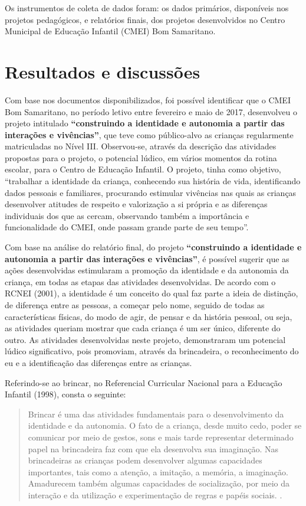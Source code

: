 \begin{refsection}
    Os instrumentos de coleta de dados foram: os dados primários, disponíveis nos projetos pedagógicos, e relatórios finais, dos projetos desenvolvidos no Centro Municipal de Educação Infantil (CMEI) Bom Samaritano.   


    \section{Resultados e discussões}

    Com base nos documentos disponibilizados, foi possível identificar que o CMEI Bom Samaritano, no período letivo entre fevereiro e maio de 2017, desenvolveu o projeto intitulado \textbf{“construindo a identidade e autonomia a partir das interações e vivências”}, que teve como público-alvo as crianças regularmente matriculadas no Nível III. Observou-se, através da descrição das atividades propostas para o projeto, o potencial lúdico, em vários momentos da rotina escolar, para o Centro de Educação Infantil. O projeto, tinha como objetivo, “trabalhar a identidade da criança, conhecendo sua história de vida, identificando dados pessoais e familiares, procurando estimular vivências nas quais as crianças desenvolver atitudes de respeito e valorização a si própria e as diferenças individuais dos que as cercam, observando também a importância e funcionalidade do CMEI, onde passam grande parte de seu tempo”.  

    Com base na análise do relatório final, do projeto \textbf{“construindo a identidade e autonomia a partir das interações e vivências”}, é possível sugerir que as ações desenvolvidas estimularam a promoção da identidade e da autonomia da criança, em todas as etapas das atividades desenvolvidas. De acordo com o RCNEI (2001), a identidade é um conceito do qual faz parte a ideia de distinção, de diferença entre as pessoas, a começar pelo nome, seguido de todas as características físicas, do modo de agir, de pensar e da história pessoal, ou seja, as atividades queriam mostrar que cada criança é um ser único, diferente do outro. As atividades desenvolvidas neste projeto, demonstraram um potencial lúdico significativo, pois promoviam, através da brincadeira, o reconhecimento do eu e a identificação das diferenças entre as crianças. 

    Referindo-se ao brincar, no Referencial Curricular Nacional para a Educação Infantil (1998), consta o seguinte: 

    \begin{quotation}
        Brincar é uma das atividades fundamentais para o desenvolvimento da identidade e da autonomia. O fato de a criança, desde muito cedo, poder se comunicar por meio de gestos, sons e mais tarde representar determinado papel na brincadeira faz com que ela desenvolva sua imaginação. Nas brincadeiras as crianças podem desenvolver algumas capacidades importantes, tais como a atenção, a imitação, a memória, a imaginação. Amadurecem também algumas capacidades de socialização, por meio da interação e da utilização e experimentação de regras e papéis sociais. \cite[p.~22]{RCNEI1998}.
    \end{quotation}


\end{refsection}
